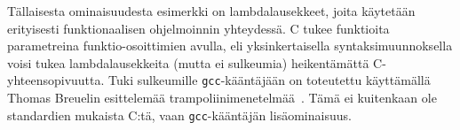 %
%
%

Tällaisesta ominaisuudesta esimerkki on lambdalausekkeet, joita käytetään
erityisesti funktionaalisen ohjelmoinnin yhteydessä. C tukee funktioita
parametreina funktio-osoittimien avulla, eli yksinkertaisella
syntaksimuunnoksella voisi tukea lambdalausekkeita (mutta ei sulkeumia)
heikentämättä C-yhteensopivuutta. Tuki sulkeumille \texttt{gcc}-kääntäjään on
toteutettu käyttämällä Thomas Breuelin esittelemää
trampoliinimenetelmää~\citep{gccnested, cppclosure}. Tämä ei kuitenkaan ole
standardien mukaista C:tä, vaan \texttt{gcc}-kääntäjän lisäominaisuus.

%

